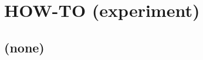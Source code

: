 
\cleardoublepage


\chapter{HOW-TO (experiment)}\label{ch:how-to-experiment}

\hfill \break

\newpage

\section{(none)}

